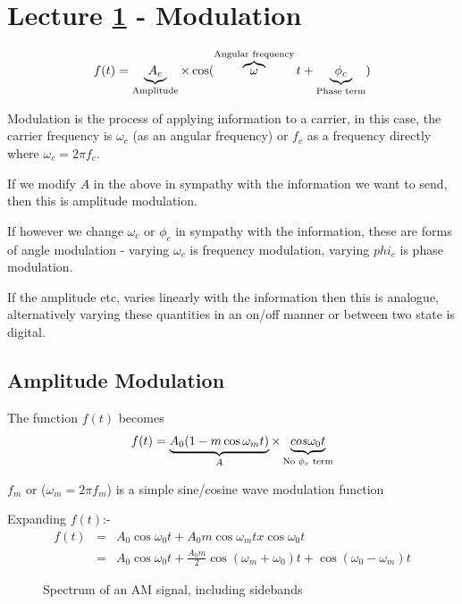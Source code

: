 \documentclass[11pt]{article} %
\begin{document}
\section{Lecture \ref{sec:lec1} - Modulation}
\label{sec:lec1}
\begin{equation}
	f(t) = \underbrace{A_c}_{\mbox{\scriptsize Amplitude}} \times \cos(\overbrace{\omega}^{\mbox{\scriptsize Angular frequency}} t + \underbrace{\phi _c}_{\mbox{\scriptsize Phase term}})
\label{eq:radio}
\end{equation}

Modulation is the process of applying information to a carrier, in this case, the carrier frequency is $\omega _c$ (as an angular frequency) or $f_c$ as a frequency directly where $\omega_c = 2 \pi f_c$.

If we modify $A$ in the above in sympathy with the information we want to send, then this is amplitude modulation.

If however we change $\omega_c$ or $\phi _c$ in sympathy with the information, these are forms of angle modulation - varying $\omega _c$ is frequency modulation, varying $phi _c$ is phase modulation.

If the amplitude etc, varies linearly with the information then this is analogue, alternatively varying these quantities in an on/off manner or between two state is digital.

\subsection{Amplitude Modulation}
The function $f(t)$ becomes
\begin{equation}
	f(t)=\underbrace{A_0(1-m \cos \omega_m t)}_{A} \times \underbrace{cos \omega _0 t}_{\mbox{\scriptsize No $\phi _c$ term}}
\label{eqn:am}
\end{equation}

$f_m$ or ($\omega_m = 2 \pi f_m$) is a simple sine/cosine wave modulation function

Expanding $f(t)$:-
\begin{eqnarray}
f(t) &=& A_0 \cos \omega_0t + A_0m \cos\omega_mt x \cos \omega_0 t \nonumber \\
&=& A_0 \cos\omega_0t+\frac{A_0m}{2} \cos(\omega_m+\omega_0)t+\cos(\omega_0-\omega_m)t
\end{eqnarray}
	\begin{figure}[h]
		\centering
		\caption{Spectrum of an AM signal, including sidebands}
	\end{figure}
\end{document}
